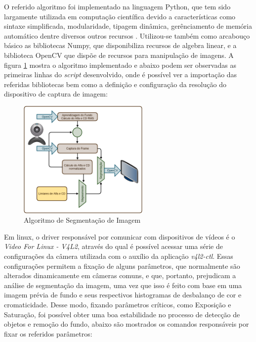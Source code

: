 \documentclass[conference]{IEEEtran}
\begin{document}
O referido algoritmo foi implementado na linguagem Python, que tem sido largamente utilizada em computação científica devido a características como sintaxe simplificada, modularidade, tipagem dinâmica, gerênciamento de memória automático dentre diversos outros recursos \cite{IEEEhowto:fangohr}. Utilizou-se também como arcabouço básico as bibliotecas Numpy, que disponibiliza recursos de algebra linear, e a biblioteca OpenCV que dispõe de recursos para manipulação de imagens. A figura \ref{fig:algoritmo} mostra o algoritmo implementado e abaixo podem ser observadas as primeiras linhas do \textit{script} desenvolvido, onde é possível ver a importação das referidas bibliotecas bem como a definição e configuração da resolução do dispositivo de captura de imagem:



\begin{figure}[!t]
\centering
\includegraphics[width=2.5in]{Algoritmo}
\caption{Algoritmo de Segmentação de Imagem}
\label{fig:algoritmo}
\end{figure}

Em linux, o driver responsável por comunicar com dispositivos de vídeos é o \textit{Video For Linux - V4L2}, através do qual é possível acessar uma série de configurações da câmera utilizada com o auxílio da aplicação \textit{v4l2-ctl}. Essas configurações permitem a fixação de alguns parâmetros, que normalmente são alterados dinamicamente em câmeras comuns, e que, portanto, prejudicam a análise de segmentação da imagem, uma vez que isso é feito com base em uma imagem prévia de fundo e seus respectivos histogramas de desbalanço de cor e cromaticidade. Desse modo, fixando parâmetros críticos, como Exposição e Saturação, foi possível obter uma boa estabilidade no processo de detecção de objetos e remoção do fundo, abaixo são mostrados os comandos responsáveis por fixar os referidos parâmetros:
\end{document}
